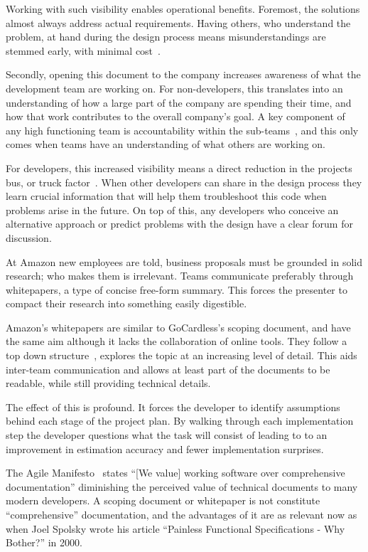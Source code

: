 \documentclass[11pt]{article}
\begin{document}
Working with such visibility enables operational benefits. 
Foremost, the solutions almost always address actual requirements. 
Having others, who understand the problem, at hand during the design process 
means misunderstandings are stemmed early, with minimal
cost~\cite{costOfChangeEssay}.

Secondly, opening this document to the company increases awareness of
what the development team are working on. For non-developers, this translates
into an understanding of how a large part of the company are spending their
time, and how that work contributes to the overall company's goal. A key
component of any high functioning team is accountability within the
sub-teams~\cite{fiveDysfunctions}, and this only comes when teams have an
understanding of what others are working on.

For developers, this increased visibility means a direct reduction in the
projects bus, or truck factor~\cite{truckFactor}. When other developers can share
in the design process they learn crucial information that will help them
troubleshoot this code when problems arise in the future. On top of this, any
developers who conceive an alternative approach or predict problems with the
design have a clear forum for discussion.

At Amazon new employees are told, business proposals must be grounded in solid 
research; who makes them is irrelevant. Teams communicate preferably through whitepapers, 
a type of concise free-form summary. This forces the presenter to compact their 
research into something easily digestible.

Amazon's whitepapers are similar to GoCardless's scoping
document, and have the same aim although it lacks the
collaboration of online tools. They follow a
top down structure~\cite{reportingAndWriting}, explores the topic 
at an increasing level of detail. This aids inter-team communication and
allows at least part of the documents to be readable, while still providing
technical details.

The effect of this is profound. It forces the developer to identify
assumptions behind each stage of the project plan. 
By walking through each implementation step the developer
questions what the task will consist of leading to to an improvement 
in estimation accuracy and fewer implementation surprises.

The Agile Manifesto~\cite{agileManifesto} states “[We value] working software
over comprehensive documentation” diminishing the perceived value of technical 
documents to many modern developers. A scoping
document or whitepaper is not constitute “comprehensive” documentation, and
the advantages of it are as relevant now as when Joel
Spolsky wrote his article “Painless Functional Specifications - Why Bother?” in
2000.
\end{document}
